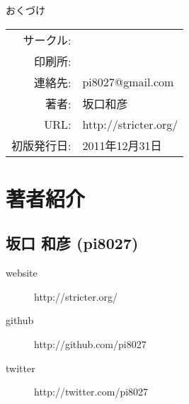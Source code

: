 \pagestyle{empty}
\begin{itembox}[1]{おくづけ}
\begin{tabular}{rl}
サークル:   & \\
印刷所:     & \\
連絡先:     & pi8027@gmail.com \\
著者:       & 坂口和彦 \\
URL:        & http://stricter.org/ \\
初版発行日: & 2011年12月31日 \\
\end{tabular}
\end{itembox}

\section*{著者紹介}

\subsection*{坂口 和彦 (pi8027)}

\begin{description}
\item[website] http://stricter.org/
\item[github] http://github.com/pi8027
\item[twitter] http://twitter.com/pi8027
\end{description}




